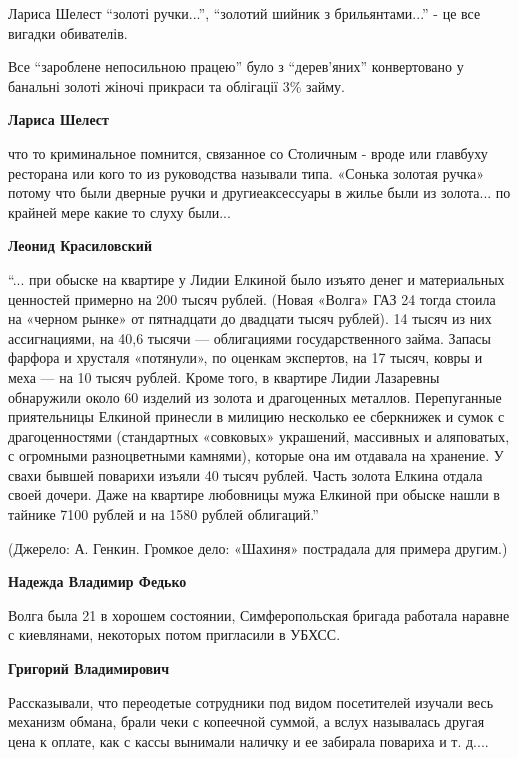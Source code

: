 \begin{itemize}
\begin{itemize}
Лариса Шелест \enquote{золоті ручки...}, \enquote{золотий шийник з брильянтами...} - це все
вигадки обивателів.

Все \enquote{зароблене непосильною працею} було з \enquote{дерев'яних} конвертовано у банальні
золоті жіночі прикраси та облігації 3\% займу.


\textbf{Лариса Шелест} 

что то криминальное помнится, связанное со Столичным - вроде или главбуху
ресторана или кого то из руководства называли типа. «Сонька золотая ручка»
потому что были дверные ручки и другиеаксессуары в жилье были из золота... по
крайней мере какие то слуху были...

\begin{itemize} %
\textbf{Леонид Красиловский} 

\enquote{... при обыске на квартире у Лидии Елкиной было изъято денег и материальных
ценностей примерно на 200 тысяч рублей. (Новая «Волга» ГАЗ 24 тогда стоила на
«черном рынке» от пятнадцати до двадцати тысяч рублей). 14 тысяч из них
ассигнациями, на 40,6 тысячи — облигациями государственного займа. Запасы
фарфора и хрусталя «потянули», по оценкам экспертов, на 17 тысяч, ковры и меха
— на 10 тысяч рублей. Кроме того, в квартире Лидии Лазаревны обнаружили около
60 изделий из золота и драгоценных металлов. Перепуганные приятельницы Елкиной
принесли в милицию несколько ее сберкнижек и сумок с драгоценностями
(стандартных «совковых» украшений, массивных и аляповатых, с огромными
разноцветными камнями), которые она им отдавала на хранение. У свахи бывшей
поварихи изъяли 40 тысяч рублей. Часть золота Елкина отдала своей дочери. Даже
на квартире любовницы мужа Елкиной при обыске нашли в тайнике 7100 рублей и на
1580 рублей облигаций.}

(Джерело: А. Генкин. Громкое дело: «Шахиня» пострадала для примера другим.)


\textbf{Надежда Владимир Федько} 

Волга была 21 в хорошем состоянии, Симферопольская бригада работала наравне с
киевлянами, некоторых потом пригласили в УБХСС.

\textbf{Григорий Владимирович} 

Рассказывали, что переодетые сотрудники под видом посетителей изучали весь
механизм обмана, брали чеки с копеечной суммой, а вслух называлась другая цена к
оплате, как с кассы вынимали наличку и ее забирала повариха и т. д....


\end{itemize}
\end{itemize}
\end{itemize}
